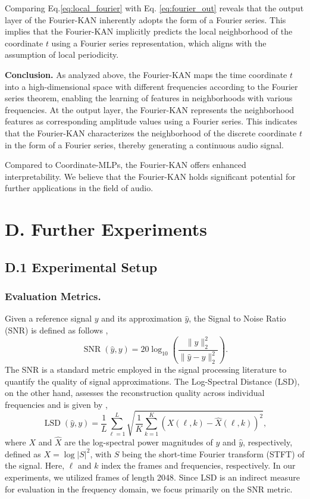 \documentclass[letterpaper]{article} %
\begin{document}
Comparing Eq.\ref{eq:local_fourier} with Eq. \ref{eq:fourier_out} reveals that the output layer of the Fourier-KAN inherently adopts the form of a Fourier series. This implies that the Fourier-KAN implicitly predicts the local neighborhood of the coordinate \( t \) using a Fourier series representation, which aligns with the assumption of local periodicity.

\textbf{Conclusion.} 
As analyzed above, the Fourier-KAN maps the time coordinate \( t \) into a high-dimensional space with different frequencies according to the Fourier series theorem, enabling the learning of features in neighborhoods with various frequencies. At the output layer, the Fourier-KAN represents the neighborhood features as corresponding amplitude values using a Fourier series. This indicates that the Fourier-KAN characterizes the neighborhood of the discrete coordinate \( t \) in the form of a Fourier series, thereby generating a continuous audio signal.

Compared to Coordinate-MLPs, the Fourier-KAN offers enhanced interpretability. We believe that the Fourier-KAN holds significant potential for further applications in the field of audio.

\section{D. Further Experiments}

\subsection{D.1 Experimental Setup}
\subsubsection{Evaluation Metrics.} 
Given a reference signal \( y \) and its approximation \( \hat{y} \), the Signal to Noise Ratio (SNR) is defined as follows \cite{roux2018snr},
$$
\operatorname{SNR}(\hat{y}, y)= 20 \log_{10} \left( \frac{\|y\|_2^2}{\|\hat{y}-y\|_2^2} \right).
$$
The SNR is a standard metric employed in the signal processing literature to quantify the quality of signal approximations. The Log-Spectral Distance (LSD), on the other hand, assesses the reconstruction quality across individual frequencies and is given by \cite{gray1976lsd},
$$
\operatorname{LSD}(\hat{y}, y) = \frac{1}{L} \sum_{\ell=1}^L \sqrt{\frac{1}{K} \sum_{k=1}^K (X(\ell, k) - \hat{X}(\ell, k))^2},
$$ where \( X \) and \( \hat{X} \) are the log-spectral power magnitudes of \( y \) and \( \hat{y} \), respectively, defined as \( X = \log |S|^2 \), with \( S \) being the short-time Fourier transform (STFT) of the signal. Here, \( \ell \) and \( k \) index the frames and frequencies, respectively. In our experiments, we utilized frames of length 2048. Since LSD is an indirect measure for evaluation in the frequency domain, we focus primarily on the SNR metric.
\end{document}
